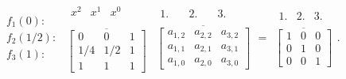 \documentclass[10pt,b5paper,titlepage]{book}
\begin{document}
\begin{equation}
    \begin{array}{r}
        \\
        f_{1}(0): \\
        f_{2}(1 / 2): \\
        f_{3}(1): \\
    \end{array}
    \begin{array}{c}
        \begin{matrix}
            x^{2} & x^{1} & x^{0}\\
        \end{matrix}\\
        \overline{
        \begin{bmatrix}
            0 & 0 & 1 \\
            1 / 4 & 1 / 2 & 1 \\
            1 & 1 & 1
        \end{bmatrix}}
    \end{array}
    \begin{array}{c}
        \begin{matrix}
            1. \quad & 2. \quad & 3.
        \end{matrix} \\
        \overline{
        \begin{bmatrix}
            a_{1,2} & a_{2,2} & a_{3,2} \\
            a_{1,1} & a_{2,1} & a_{3,1} \\
            a_{1,0} & a_{2,0} & a_{3,0}
        \end{bmatrix}
        }
    \end{array}
    =
    \begin{array}{c}
        \begin{matrix}
            1. & 2. & 3.
        \end{matrix} \\
        \overline{
        \begin{bmatrix}
            1 & 0 & 0 \\
            0 & 1 & 0 \\
            0 & 0 & 1
        \end{bmatrix}
        }
    \end{array}
.\end{equation}
\end{document}
